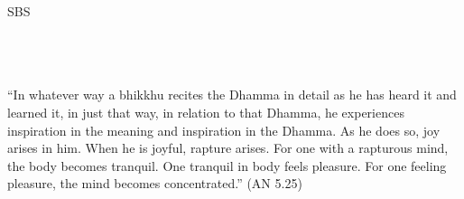 \cleartorecto
\thispagestyle{empty}
\vspace*{3em}

{\centering

  \settowidth{\titleLength}{%
    {\Large\chapterTitleFont\textsc{\MakeUppercase{{\thetitle}}}}%
  }

  {\Huge\fontsize{64}{16}\sbsFont SBS}\\[1.0\baselineskip]%

  {\Huge\chapterTitleFont\textsc{{\thetitle\linebreak}}}\\[0.2\baselineskip]

  \\[1.4\baselineskip]

  {\Large\scshape \thesubtitle}\\[2.5\baselineskip]

  {``\quoteTitle In whatever way a bhikkhu recites the Dhamma in detail as he has heard it and learned it, in just that way, in relation to that Dhamma, he experiences inspiration in the meaning and inspiration in the Dhamma. As he does so, joy arises in him. When he is joyful, rapture arises. For one with a rapturous mind, the body becomes tranquil. One tranquil in body feels pleasure. For one feeling pleasure, the mind becomes concentrated.'' (AN 5.25)}\\[1.4\baselineskip]
}
